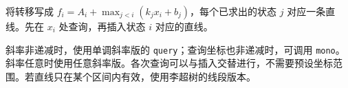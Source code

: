 将转移写成 $f_i=A_i+\max_{j<i}(k_jx_i+b_j)$，每个已求出的状态 $j$ 对应一条直线。先在 $x_i$ 处查询，再插入状态 $i$ 对应的直线。

斜率非递减时，使用单调斜率版的 \texttt{query}；查询坐标也非递减时，可调用 \texttt{mono}。斜率任意时使用任意斜率版。各次查询可以与插入交替进行，不需要预设坐标范围。若直线只在某个区间内有效，使用李超树的线段版本。
